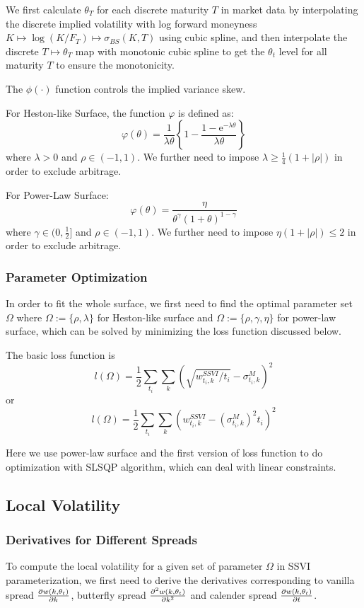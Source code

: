 \documentclass[11pt]{article}
\numberwithin{equation}{section}
\theoremstyle{remark}
\begin{document}
We first calculate $\theta_T$ for each discrete maturity $T$ in market data by interpolating the discrete implied volatility with log forward moneyness $K \mapsto \log(K/F_T) \mapsto \sigma_{BS}(K, T)$ using cubic spline, and then interpolate the discrete $T \mapsto \theta_T$ map with monotonic cubic spline to get the $\theta_t$ level for all maturity $T$ to ensure the monotonicity.

The $\phi(\cdot)$ function controls the implied variance skew.

For Heston-like Surface, the function $\varphi$ is defined as:
$$ \varphi(\theta)=\frac{1}{\lambda\theta}\left\{1-\frac{1-\mathrm{e}^{-\lambda\theta}}{\lambda\theta}\right\} $$
where $\lambda>0$ and $\rho \in (-1,1)$.
We further need to impose $\lambda \geq \frac{1}{4}\left(1+|\rho|\right)$ in order to exclude arbitrage.

For Power-Law Surface:
$$ \varphi(\theta)=\frac{\eta}{\theta^\gamma\left(1+\theta\right)^{1-\gamma}} $$
where $\gamma\in (0,\frac{1}{2}]$ and $\rho \in (-1,1)$.
We further need to impose $\eta\left(1+|\rho|\right)\leq 2$ in order to exclude arbitrage.

\subsubsection{Parameter Optimization}\label{3.4.2}
In order to fit the whole surface, we first need to find the optimal parameter set $\Omega$ where $\Omega := \{\rho, \lambda\}$ for Heston-like surface and $\Omega := \{\rho, \gamma, \eta \}$ for power-law surface, which can be solved by minimizing the loss function discussed below.

The basic loss function is
$$ l(\Omega) = \frac{1}{2} \sum_{t_i}\sum_{k}\left(\sqrt{w_{t_i,k}^{SSVI}/t_i}-\sigma_{t_i,k}^{M}\right)^2 $$
or
$$ l(\Omega) = \frac{1}{2} \sum_{t_i}\sum_{k} \left(w_{t_i,k}^{SSVI}-\left(\sigma_{t_i,k}^{M}\right)^2t_i\right)^2$$

Here we use power-law surface and the first version of loss function to do optimization with SLSQP algorithm, which can deal with linear constraints.

\subsection{Local Volatility}\label{3.5}
\subsubsection{Derivatives for Different Spreads}\label{3.5.1}
To compute the local volatility for a given set of parameter $\Omega$ in SSVI parameterization, we first need to derive the derivatives corresponding to vanilla spread $\pdv{w(k,\theta_t)}{k}$, butterfly spread $\pdv[2]{w(k,\theta_t)}{k}$ and calender spread $\pdv{w(k,\theta_t)}{t}$.
\end{document}
